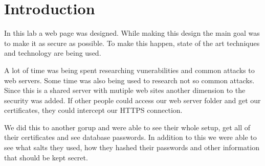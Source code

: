\section{Introduction}

In this lab a web page was designed.
While making this design the main goal was to make it as secure as possible.
To make this happen, state of the art techniques and technology are being used.

A lot of time was being spent researching vunerabilities and common attacks to web servers.
Some time was also being used to research not so common attacks.
Since this is a shared server with mutiple web sites another dimension to the security was added.
If other people could access our web server folder and get our certificates, they could intercept our HTTPS connection.

We did this to another gorup and were able to see their whole setup, get all of their certificates and see database passwords.
In addition to this we were able to see what salts they used, how they hashed their passwords and other information that should be kept secret.
